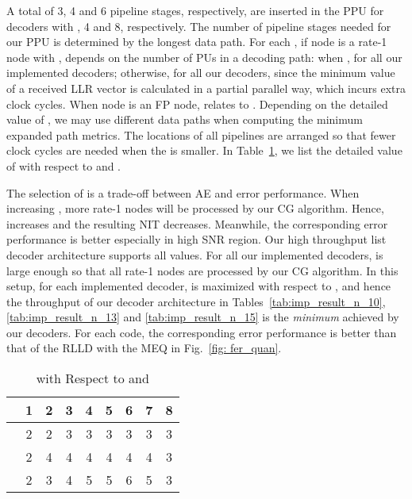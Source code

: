 \documentclass[journal]{IEEEtran}
\begin{document}
A total of 3, 4 and 6 pipeline stages, respectively, are inserted in the PPU for decoders with , 4 and 8, respectively. The number of pipeline stages needed for our PPU is determined by the longest data path. For each , if node  is a rate-1 node with ,  depends on the number of PUs in a decoding path: when ,  for all our implemented decoders; otherwise,  for all our decoders, since the minimum value of a received LLR vector is calculated in a partial parallel way, which incurs extra clock cycles. When node  is an FP node,  relates to . Depending on the detailed value of , we may use different data paths when computing the  minimum expanded path metrics. The locations of all pipelines are arranged so that fewer clock cycles are needed when the  is smaller. In Table~\ref{tab: addi_cycles}, we list the detailed value of  with respect to  and .


The selection of  is a trade-off between AE and error performance. When increasing , more rate-1 nodes will be processed by our CG algorithm. Hence,  increases and the resulting NIT decreases. Meanwhile, the corresponding error performance is better especially in high SNR region. Our high throughput list decoder architecture supports all  values. For all our implemented decoders,  is large enough so that all rate-1 nodes are processed by our CG algorithm. In this setup, for each implemented decoder,  is maximized with respect to , and hence the throughput of our decoder architecture in Tables~\ref{tab:imp_result_n_10}, \ref{tab:imp_result_n_13} and \ref{tab:imp_result_n_15} is the \emph{minimum} achieved by our decoders. For each code, the corresponding error performance is better than that of the RLLD with the MEQ in Fig.~\ref{fig: fer_quan}.

\begin{table}[hbt]
  \centering
  \caption{ with Respect to  and }
  \label{tab: addi_cycles}
  \footnotesize
  \begin{tabular}{c||c|c|c|c|c|c|c|c}
    \hline
   & 1 & 2 & 3 & 4 & 5 & 6 & 7& 8 \\ \hline\hline

      & 2         & 2        & 3        & 3        & 3        & 3        &  3       & 3 \\ \hline
    & 2         & 4        & 4        & 4        & 4         & 4        &  4       & 3 \\ \hline
     & 2         &3         & 4        &5         &5          &6        & 5        & 3 \\ \hline
  \end{tabular}
\end{table}
\end{document}
